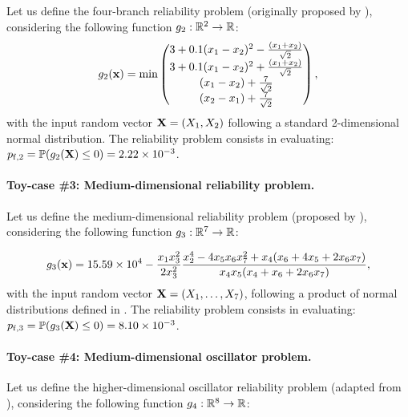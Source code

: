 Let us define the four-branch reliability problem (originally proposed by \cite{waarts2000structural}), considering the following function $g_2: \mathbb{R}^2 \rightarrow \mathbb{R}$:
\begin{align}
  g_2({\bf x}) = \min \begin{pmatrix}
    3+0.1(x_1-x_2)^2-\frac{(x_1+x_2)}{\sqrt{2}}\\
    3+0.1(x_1-x_2)^2+\frac{(x_1+x_2)}{\sqrt{2}}\\
    (x_1-x_2)+ \frac{7}{\sqrt{2}}\\
    (x_2-x_1)+ \frac{7}{\sqrt{2}}
  \end{pmatrix},
\end{align}
with the input random vector ${\bf X} = (X_1, X_2)$ following a standard 2-dimensional normal distribution. 
The reliability problem consists in evaluating: $p_{\mathrm{f}, 2} = \mathbb{P} ( g_2({\bf X}) \leq 0 ) =  2.22 \times 10^{-3}$.

\paragraph{Toy-case \#3: Medium-dimensional reliability problem.}

Let us define the medium-dimensional reliability problem (proposed by \cite{yun2018efficient}), considering the following function $g_3 : \mathbb{R}^7 \rightarrow \mathbb{R}$:

\begin{equation}
    g_3({\bf x}) = 15.59 \times 10^4 - \frac{x_1 x_3^2}{2 x_3^2} \frac{x_2^4 - 4 x_5 x_6 x_7^2 + x_4 (x_6 + 4 x_5 + 2 x_6 x_7)}{x_4 x_5 (x_4 + x_6 + 2 x_6 x_7)},
\end{equation}
with the input random vector ${\bf X} = (X_1, \dots, X_7)$, following a product of normal distributions defined in \cite{yun2018efficient}. 
The reliability problem consists in evaluating: $p_{\mathrm{f}, 3} = \mathbb{P} ( g_3({\bf X}) \leq 0 ) =  8.10 \times 10^{-3}$.


\paragraph{Toy-case \#4: Medium-dimensional oscillator problem.}
Let us define the higher-dimensional oscillator reliability problem (adapted from ), considering the following function $g_4 : \mathbb{R}^8 \rightarrow \mathbb{R}$:

